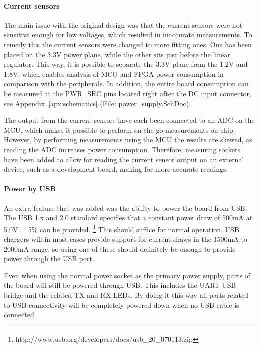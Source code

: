 \paragraph{Current sensors} \label{psu:current_sensors}

The main issue with the original design was that the current sensors were not
sensitive enough for low voltages, which resulted in inaccurate measurements. To
remedy this the current sensors were changed to more fitting ones. One has been
placed on the 3.3V power plane, while the other sits just before the linear
regulator. This way, it is possible to separate the 3.3V plane from the 1.2V and
1.8V, which enables analysis of MCU and FPGA power consumption in comparison
with the peripherals. In addition, the entire board consumption can be measured
at the PWR\_SRC pins located right after the DC input connector, see Appendix~\ref{apx:schematics}
(File: power\_supply.SchDoc).

The output from
the current sensors have each been connected to an ADC on the MCU, which makes
it possible to perform on-the-go measurements on-chip. However, by performing
measurements using the MCU the results are skewed, as reading the ADC increases
power consumption. Therefore, measuring sockets have been added to allow for
reading the current sensor output on an external device, such as a development
board, making for more accurate readings.

\paragraph{Power by USB} \label{psu:usb}

An extra feature that was added was the ability to power the board
from USB. The USB 1.x and 2.0 standard specifies that a constant
power draw of 500mA at 5.0V $\pm$ 5\% can be provided.
\footnote{http://www.usb.org/developers/docs/usb\_20\_070113.zip}
 This should suffice for
normal operation. USB chargers will in most cases provide support for
current draws in the 1500mA to 2000mA range, so using one of these should
definitely be enough to provide power through the USB port.

Even when using the normal power socket as the primary power supply, parts of
the board will still be powered through USB. This includes the UART-USB bridge
and the related TX and RX LEDs. By doing it this way all parts related to USB
connectivity will be completely powered down when no USB cable is connected.
